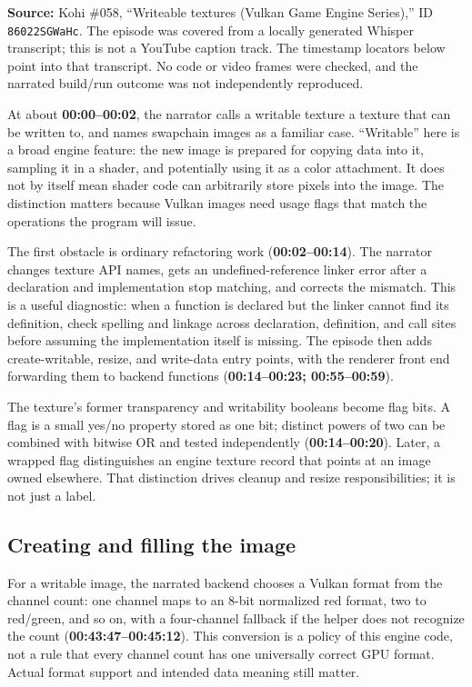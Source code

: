 \textbf{Source:} Kohi \#058, ``Writeable textures (Vulkan Game Engine Series),'' ID \texttt{86022SGWaHc}. The episode was covered from a locally generated Whisper transcript; this is not a YouTube caption track. The timestamp locators below point into that transcript. No code or video frames were checked, and the narrated build/run outcome was not independently reproduced.

At about \textbf{00:00--00:02}, the narrator calls a writable texture a texture that can be written to, and names swapchain images as a familiar case. ``Writable'' here is a broad engine feature: the new image is prepared for copying data into it, sampling it in a shader, and potentially using it as a color attachment. It does not by itself mean shader code can arbitrarily store pixels into the image. The distinction matters because Vulkan images need usage flags that match the operations the program will issue.

The first obstacle is ordinary refactoring work (\textbf{00:02--00:14}). The narrator changes texture API names, gets an undefined-reference linker error after a declaration and implementation stop matching, and corrects the mismatch. This is a useful diagnostic: when a function is declared but the linker cannot find its definition, check spelling and linkage across declaration, definition, and call sites before assuming the implementation itself is missing. The episode then adds create-writable, resize, and write-data entry points, with the renderer front end forwarding them to backend functions (\textbf{00:14--00:23; 00:55--00:59}).

The texture's former transparency and writability booleans become flag bits. A flag is a small yes/no property stored as one bit; distinct powers of two can be combined with bitwise OR and tested independently (\textbf{00:14--00:20}). Later, a wrapped flag distinguishes an engine texture record that points at an image owned elsewhere. That distinction drives cleanup and resize responsibilities; it is not just a label.

\subsection{Creating and filling the image}\label{06-engine-ii-ch026-creating-and-filling-the-image}

For a writable image, the narrated backend chooses a Vulkan format from the channel count: one channel maps to an 8-bit normalized red format, two to red/green, and so on, with a four-channel fallback if the helper does not recognize the count (\textbf{00:43:47--00:45:12}). This conversion is a policy of this engine code, not a rule that every channel count has one universally correct GPU format. Actual format support and intended data meaning still matter.

